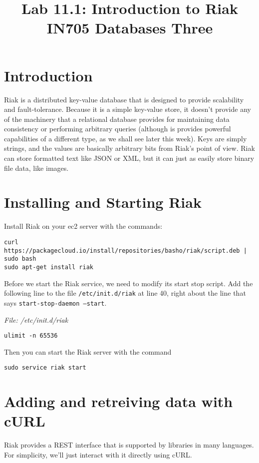 \documentclass{article}
\begin{document}
\title{Lab 11.1: Introduction to Riak\\ IN705 Databases Three}
\date{}
\maketitle

\section*{Introduction}
Riak is a distributed key-value database that is designed to provide scalability and fault-tolerance.  Because it is a simple key-value store, it doesn't provide any of the machinery that a relational database provides for maintaining data consistency or performing arbitrary queries (although is provides powerful capabilities of a different type, as we shall  see later this week).  Keys are simply strings, and the values are basically arbitrary bits from Riak's point of view.  Riak can store formatted text like JSON or XML, but it can just as easily store binary file data, like images.

\section{Installing and Starting Riak}
Install Riak on your ec2 server with the commands:

\begin{verbatim}
curl https://packagecloud.io/install/repositories/basho/riak/script.deb | sudo bash
sudo apt-get install riak
\end{verbatim}

Before we start the Riak service, we need to modify its start stop script.  Add the following line to the file \texttt{/etc/init.d/riak} at line 40, right about the line that says \texttt{start-stop-daemon --start}.

\emph{File:  /etc/init.d/riak}

\begin{verbatim}
ulimit -n 65536
\end{verbatim}

Then you can start the Riak server with the command

\begin{verbatim}
sudo service riak start
\end{verbatim}

\section{Adding and retreiving data with cURL}
Riak provides a REST interface that is supported by libraries in many languages.  For simplicity, we'll just interact with it directly using cURL.
\end{document}
